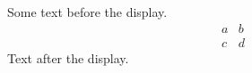 \documentclass[12pt]{article}
\begin{document}
Some text before the display.
\[ \begin{matrix} a & b \\ c & d \end{matrix} \]
Text after the display.
\end{document}
